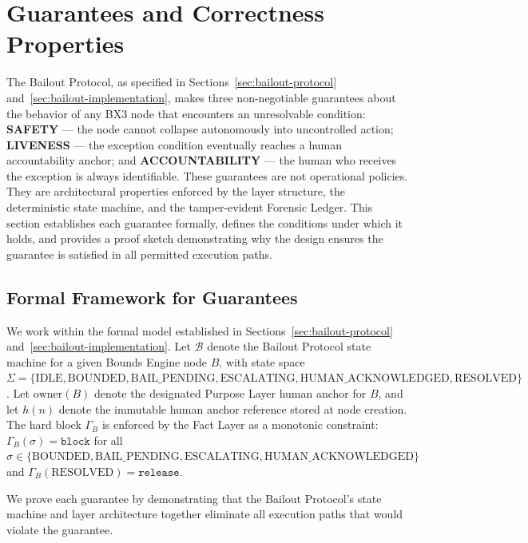 \section{Guarantees and Correctness Properties}
\label{sec:guarantees}

The Bailout Protocol, as specified in Sections~\ref{sec:bailout-protocol} and~\ref{sec:bailout-implementation}, makes three non-negotiable guarantees about the behavior of any BX3 node that encounters an unresolvable condition: \textbf{SAFETY} — the node cannot collapse autonomously into uncontrolled action; \textbf{LIVENESS} — the exception condition eventually reaches a human accountability anchor; and \textbf{ACCOUNTABILITY} — the human who receives the exception is always identifiable. These guarantees are not operational policies. They are architectural properties enforced by the layer structure, the deterministic state machine, and the tamper-evident Forensic Ledger. This section establishes each guarantee formally, defines the conditions under which it holds, and provides a proof sketch demonstrating why the design ensures the guarantee is satisfied in all permitted execution paths.

\subsection{Formal Framework for Guarantees}

We work within the formal model established in Sections~\ref{sec:bailout-protocol} and~\ref{sec:bailout-implementation}. Let $\mathcal{B}$ denote the Bailout Protocol state machine for a given Bounds Engine node $B$, with state space $\Sigma = \{\text{IDLE}, \text{BOUNDED}, \text{BAIL\_PENDING}, \text{ESCALATING}, \text{HUMAN\_ACKNOWLEDGED}, \text{RESOLVED}\}$. Let $\text{owner}(B)$ denote the designated Purpose Layer human anchor for $B$, and let $h(n)$ denote the immutable human anchor reference stored at node creation. The hard block $\Gamma_B$ is enforced by the Fact Layer as a monotonic constraint: $\Gamma_B(\sigma) = \texttt{block}$ for all $\sigma \in \{\text{BOUNDED}, \text{BAIL\_PENDING}, \text{ESCALATING}, \text{HUMAN\_ACKNOWLEDGED}\}$ and $\Gamma_B(\text{RESOLVED}) = \texttt{release}$.

We prove each guarantee by demonstrating that the Bailout Protocol's state machine and layer architecture together eliminate all execution paths that would violate the guarantee.

